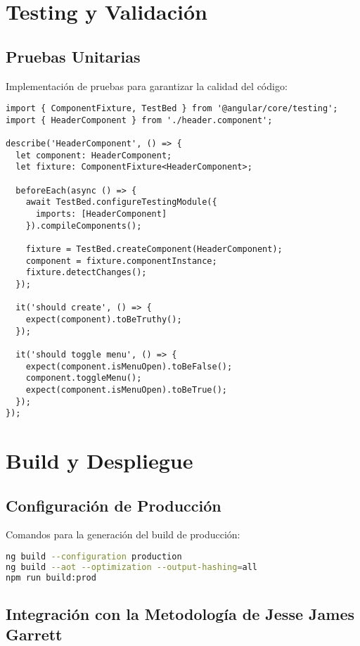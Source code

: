 \section{Testing y Validación}

\subsection{Pruebas Unitarias}

Implementación de pruebas para garantizar la calidad del código:

\begin{lstlisting}[caption=Component Testing]
import { ComponentFixture, TestBed } from '@angular/core/testing';
import { HeaderComponent } from './header.component';

describe('HeaderComponent', () => {
  let component: HeaderComponent;
  let fixture: ComponentFixture<HeaderComponent>;

  beforeEach(async () => {
    await TestBed.configureTestingModule({
      imports: [HeaderComponent]
    }).compileComponents();

    fixture = TestBed.createComponent(HeaderComponent);
    component = fixture.componentInstance;
    fixture.detectChanges();
  });

  it('should create', () => {
    expect(component).toBeTruthy();
  });

  it('should toggle menu', () => {
    expect(component.isMenuOpen).toBeFalse();
    component.toggleMenu();
    expect(component.isMenuOpen).toBeTrue();
  });
});
\end{lstlisting}

\section{Build y Despliegue}

\subsection{Configuración de Producción}

Comandos para la generación del build de producción:

\begin{lstlisting}[language=bash, caption=Production Build]
ng build --configuration production
ng build --aot --optimization --output-hashing=all
npm run build:prod
\end{lstlisting}

\subsection{Integración con la Metodología de Jesse James Garrett}

